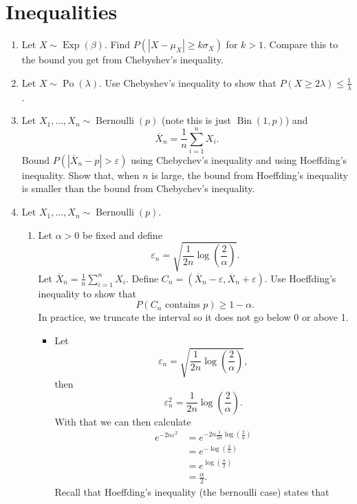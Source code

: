\documentclass{article}
\begin{document}
\section{Inequalities}
\begin{enumerate}
	\item Let $X \sim \operatorname{Exp}(\beta)$. Find $P(|X - \mu_X| \geq k \sigma_X)$ for $k > 1$. Compare this to the bound you get from Chebyshev's inequality.
	\item Let $X \sim \operatorname{Po}(\lambda)$. Use Chebyshev's inequality to show that $P(X \geq 2\lambda) \leq \frac{1}{\lambda}$.
	\item Let $X_1, \dots, X_n \sim \operatorname{Bernoulli}(p)$ (note this is just $\operatorname{Bin}(1, p)$) and
	$$
	\overline{X}_n = \frac{1}{n} \sum_{i = 1}^n X_i.
	$$
	Bound $P(|\overline{X}_n - p| > \varepsilon)$ using Chebychev's inequality and using Hoeffding's inequality. Show that, when $n$ is large, the bound from Hoeffding's inequality is smaller than the bound from Chebychev's inequality.
	\item Let $X_1, \dots, X_n \sim \operatorname{Bernoulli}(p)$.
		\begin{enumerate}
			\item Let $\alpha > 0$ be fixed and define
			$$
			\varepsilon_n = \sqrt{\frac{1}{2n}\log\left(\frac{2}{\alpha}\right)}.
			$$
			Let $\overline{X}_n = \frac{1}{n}\sum_{i = 1}^n X_i$. Define $C_n = (\overline{X}_n - \varepsilon, \overline{X}_n + \varepsilon)$. Use Hoeffding's inequality to show that
			$$
			P(C_n\text{ contains }p) \geq 1 - \alpha.
			$$
			In practice, we truncate the interval so it does not go below $0$ or above 1.
				\begin{itemize}
					\item Let
					$$
					\varepsilon_n = \sqrt{\frac{1}{2n} \log\left(\frac{2}{\alpha}\right)},
					$$
					then
					$$
					\varepsilon_n^2 = \frac{1}{2n} \log\left(\frac{2}{\alpha}\right).
					$$
					With that we can then calculate
					$$
					\begin{aligned}
					e^{-2n\varepsilon^2} &= e^{- 2n \frac{1}{2n} \log\left( \frac{2}{\alpha} \right)} \\
					&= e^{- \log \left( \frac{2}{\alpha} \right)} \\
					&= e^{\log\left( \frac{\alpha}{2} \right)} \\
					&= \frac{\alpha}{2}.
					\end{aligned}
					$$
					Recall that Hoeffding's inequality (the bernoulli case) states that
					$$
$$
\end{itemize}
\end{enumerate}
\end{enumerate}
\end{document}

